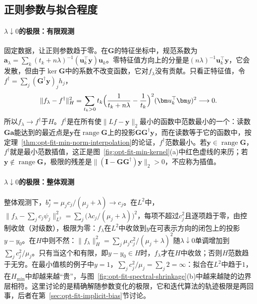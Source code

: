 \subsection{正则参数与拟合程度}
\label{sec:opt-fit-lambda}

\paragraph{$\lambda\downarrow0$的极限：有限观测}
固定数据，让正则参数趋于零。在$\bm G$的特征坐标中，规范系数为$\bm a_\lambda=\sum_k(t_k+n\lambda)^{-1}(\bm u_k^\top\bm y)\bm u_k$。零特征值方向上的分量是$(n\lambda)^{-1}\bm u_k^\top\bm y$，它会发散，但由于$\ker\bm G$中的系数不改变函数，它对$f_\lambda$没有贡献。只看正特征值，令$f^\dagger=\sum_j(\bm G^\dagger\bm y)_jh_j$，
\[
  \|f_\lambda-f^\dagger\|_H^2=\sum_{t_k>0}t_k\Bigl(\frac1{t_k+n\lambda}-\frac1{t_k}\Bigr)^2(\bm u_k^\top\bm y)^2\longrightarrow0 .
\]
所以$f_\lambda\to f^\dagger$于$H$。$f^\dagger$是在所有使$\|Lf-\bm y\|_2$最小的函数中范数最小的一个：读数$\bm G\bm a$能达到的最近点是$\bm y$在$\operatorname{range}\bm G$上的投影$\bm G\bm G^\dagger\bm y$，而在读数等于它的函数中，按定理~\ref{thm:opt-fit-min-norm-interpolation}的论证，$f^\dagger$范数最小。若$\bm y\in\operatorname{range}\bm G$，$f^\dagger$就是最小范数插值，这正是图~\ref{fig:opt-fit-min-kernel}(a)中红色虚线的来历；若$\bm y\notin\operatorname{range}\bm G$，极限的残差是$\|(\bm I-\bm G\bm G^\dagger)\bm y\|_2>0$，不应称为插值。

\paragraph{$\lambda\downarrow0$的极限：整体观测}
整体观测下，$b_j^\star=\mu_jc_j/(\mu_j+\lambda)\to c_j$。在$L^2$中，$\|f_\lambda-\sum_jc_j\psi_j\|_{L^2}^2=\sum_j\bigl(\lambda c_j/(\mu_j+\lambda)\bigr)^2$，每项不超过$c_j^2$且逐项趋于零，由控制收敛（对级数），极限为零：$f_\lambda$在$L^2$中收敛到$y$在可表示方向的闭包上的投影$y-y_0$。在$H$中则不然：$\|f_\lambda\|_H^2=\sum_j\mu_jc_j^2/(\mu_j+\lambda)^2$随$\lambda\downarrow0$单调增加到$\sum_jc_j^2/\mu_j$。只有当这个和有限，即$y-y_0\in H$时，$f_\lambda$才在$H$中收敛；否则$H$范数趋于无穷。在最小值核的例子中$y=1$，$\sum_jc_j^2/\mu_j=\sum_j2=\infty$：拟合在$L^2$中趋于$1$，在$H_{\min}$中却越来越“贵”，与图~\ref{fig:opt-fit-spectral-shrinkage}(b)中越来越陡的边界层相符。这里讨论的是精确解随参数变化的极限，它和迭代算法的轨迹极限是两回事，后者在第~\ref{sec:opt-fit-implicit-bias}节讨论。

